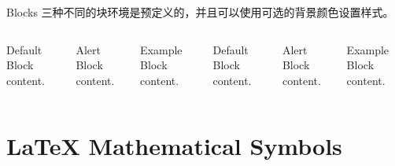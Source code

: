 \documentclass[10pt,UTF8]{ctexbeamer}
\begin{document}
\begin{frame}{Blocks}
  三种不同的块环境是预定义的，并且可以使用可选的背景颜色设置样式。

  \begin{columns}[T,onlytextwidth]
      \begin{block}{Default}
        Block content.
      \end{block}

      \begin{alertblock}{Alert}
        Block content.
      \end{alertblock}

      \begin{exampleblock}{Example}
        Block content.
      \end{exampleblock}



      \begin{block}{Default}
        Block content.
      \end{block}

      \begin{alertblock}{Alert}
        Block content.
      \end{alertblock}

      \begin{exampleblock}{Example}
        Block content.
      \end{exampleblock}

  \end{columns}
\end{frame}

\section{\LaTeX{} Mathematical Symbols}
\end{document}
